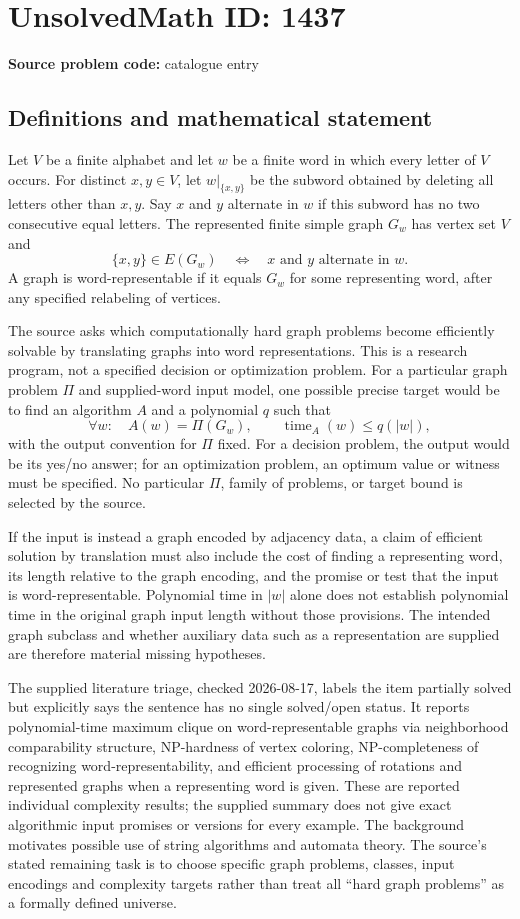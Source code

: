 \documentclass[11pt]{article}
\begin{document}
\section*{UnsolvedMath ID: 1437}
\textbf{Source problem code:} catalogue entry
\subsection{Definitions and mathematical statement}
Let $V$ be a finite alphabet and let $w$ be a finite word in which every letter of $V$ occurs. For distinct $x,y\in V$, let $w|_{\{x,y\}}$ be the subword obtained by deleting all letters other than $x,y$. Say $x$ and $y$ alternate in $w$ if this subword has no two consecutive equal letters. The represented finite simple graph $G_w$ has vertex set $V$ and
\[
\{x,y\}\in E(G_w)\quad\Longleftrightarrow\quad
x\text{ and }y\text{ alternate in }w.
\]
A graph is word-representable if it equals $G_w$ for some representing word, after any specified relabeling of vertices.

The source asks which computationally hard graph problems become efficiently solvable by translating graphs into word representations. This is a research program, not a specified decision or optimization problem. For a particular graph problem $\Pi$ and supplied-word input model, one possible precise target would be to find an algorithm $A$ and a polynomial $q$ such that
\[
\forall w:\quad A(w)=\Pi(G_w),\qquad
\operatorname{time}_A(w)\leq q(|w|),
\]
with the output convention for $\Pi$ fixed. For a decision problem, the output would be its yes/no answer; for an optimization problem, an optimum value or witness must be specified. No particular $\Pi$, family of problems, or target bound is selected by the source.

If the input is instead a graph encoded by adjacency data, a claim of efficient solution by translation must also include the cost of finding a representing word, its length relative to the graph encoding, and the promise or test that the input is word-representable. Polynomial time in $|w|$ alone does not establish polynomial time in the original graph input length without those provisions. The intended graph subclass and whether auxiliary data such as a representation are supplied are therefore material missing hypotheses.

The supplied literature triage, checked 2026-08-17, labels the item partially solved but explicitly says the sentence has no single solved/open status. It reports polynomial-time maximum clique on word-representable graphs via neighborhood comparability structure, NP-hardness of vertex coloring, NP-completeness of recognizing word-representability, and efficient processing of rotations and represented graphs when a representing word is given. These are reported individual complexity results; the supplied summary does not give exact algorithmic input promises or versions for every example. The background motivates possible use of string algorithms and automata theory. The source's stated remaining task is to choose specific graph problems, classes, input encodings and complexity targets rather than treat all ``hard graph problems'' as a formally defined universe.
\end{document}
